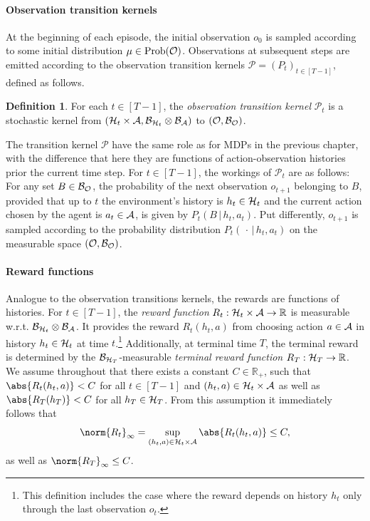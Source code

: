 \documentclass[
    a4paper,
    11pt,
    bibliography=totoc,
    listof=totoc,      
    headinclude=true,
    cleardoublepage=empty,
]{scrbook}
\theoremstyle{plain}
\theoremstyle{definition}
\newtheorem{definition}[theorem]{Definition}
\theoremstyle{remark}
\newcommand{\SetR}{\mathbb R}
\newcommand{\SpaceA}{{\cal A}}
\newcommand{\SpaceO}{{\cal O}}
\newcommand{\SpaceH}{{\cal H}}
\begin{document}
\paragraph{Observation transition kernels}
\label{par:ObservationTransitions}
At the beginning of each episode, the initial observation $o_0$ is 
sampled according to some initial distribution $\mu\in\text{Prob}(\SpaceO)$.
Observations at subsequent steps are emitted according to the observation
transition kernels $\mathcal{P} = (P_t)_{t\in[T-1]}$, defined as follows.
\begin{definition}
\label{def:ObservationTransitionKernel}
    For each $t\in[T-1]$, the \textit{observation transition kernel}
    $\mathcal{P}_t$ is a stochastic kernel from 
    $(\SpaceH_t\times\SpaceA, 
        \mathcal{B}_{\SpaceH_t}\otimes\mathcal{B}_\SpaceA)$
    to $(\SpaceO, \mathcal{B}_\SpaceO)$. 
\end{definition}
The transition kernel $\mathcal{P}$ have the same role as for MDPs in the 
previous chapter, with the difference that here they are functions of 
action-observation histories prior the current time step.
For $t\in[T-1]$, the workings of $\mathcal{P}_t$ are as follows: For any set 
$B\in\mathcal{B}_\SpaceO$, the probability of the next
observation $o_{t+1}$ belonging to $B$, provided that up to $t$ the
environment's history is $h_t\in\SpaceH_t$ and the current action chosen by
the agent is $a_t\in\SpaceA$, is given by $P_t(B\,|\,h_t,a_t)$. Put
differently, $o_{t+1}$ is sampled according to the probability distribution 
$P_t(\,\cdot\,|\, h_t,a_t)$ on the measurable space 
$(\SpaceO, \mathcal{B}_\SpaceO)$.

\paragraph{Reward functions}
Analogue to the observation transitions kernels, the rewards are functions of
histories. For $t\in[T-1]$, the \textit{reward function} $R_t:\SpaceH_t \times \SpaceA
\to \SetR$ is measurable w.r.t. $\mathcal{B}_{\SpaceH_t} \otimes 
\mathcal{B}_\SpaceA$. It provides the reward $R_t(h_t, a)$ from choosing
action $a\in\SpaceA$ in history $h_t \in
\SpaceH_t$ at time $t$.\footnote{
    This definition includes the case where the reward depends on history
    $h_t$ only through the last observation $o_t$.
}
Additionally, at terminal time $T$, the terminal
reward is determined by the $\mathcal{B}_{\SpaceH_T}$-measurable
\textit{terminal reward function} $R_T:\SpaceH_T\to \SetR$. We assume 
throughout that there exists a constant
$C\in\SetR_+$, such that $\abs{R_t(h_t,a)} < C$ for all $t\in[T-1]$ and
$(h_t,a)\in\SpaceH_t\times \SpaceA$ as well as $\abs{R_T(h_T)} < C$ for all
$h_T\in\SpaceH_T$. From this assumption it immediately follows that 
\[
    \norm{R_t}_\infty = 
    \sup_{(h_t,a)\in\SpaceH_t\times\SpaceA} \abs{R_t(h_t,a)} \leq C,
\]
as well as $\norm{R_T}_\infty \leq C$.
\end{document}
